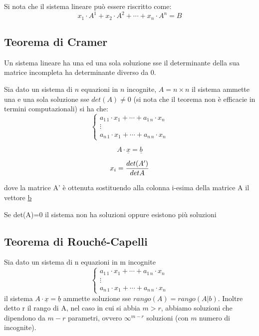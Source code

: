 \documentclass[a4paper,12pt, oneside]{book}
\begin{document}
Si nota che il sistema lineare può essere riscritto come:
$$x_1\cdot A^1+x_2\cdot A^2+\cdots + x_n\cdot A^n=B$$
\subsection{Teorema di Cramer}
\begin{teorema}[ di Cramer]
	Un sistema lineare ha una ed una sola soluzione sse il determinante della sua matrice incompleta ha determinante diverso da 0.
\end{teorema}
\begin{teorema}
	Sia dato un sistema di $n$ equazioni in $n$ incognite, $A=n\times n$ il sistema ammette una e una sola soluzione sse $det(A)\neq 0$ (si nota che il teorema non è efficacie in termini computazionali)
	si ha che:
	$$\begin{cases}
			a_{1\,1}\cdot x_1+\cdots+a_{1\,n}\cdot x_n \\
			\vdots                                     \\
			a_{n\,1}\cdot x_1+\cdots+a_{n\,n}\cdot x_n
		\end{cases}$$

	$$A\cdot \underline{x}=\underline{b}$$

	$$x_{i} = {{det(A')}\over{detA}}$$

	dove la matrice A' è ottenuta sostituendo alla colonna i-esima della matrice A il vettore \underline{b}

	Se det(A)=0 il sistema non ha soluzioni oppure esistono più soluzioni
\end{teorema}
\newpage
\subsection{Teorema di Rouché-Capelli}
\begin{teorema}
	Sia dato un sistema di n equazioni in m incognite
	$$\begin{cases}
			a_{1\,1}\cdot x_1+\cdots+a_{1\,n}\cdot x_n \\
			\vdots                                     \\
			a_{n\,1}\cdot x_1+\cdots+a_{n\,n}\cdot x_n
		\end{cases}$$
	il sistema $A\cdot \underline{x}=\underline{b}$ ammette soluzione sse $rango(A)=rango(A|b)$. Inoltre detto r il rango di A, nel caso in cui si abbia $m>r$, abbiamo soluzioni che dipendono da $m-r$ parametri, ovvero $\infty^{m-r}$ soluzioni (con $m$ numero di incognite).
\end{teorema}
\end{document}
